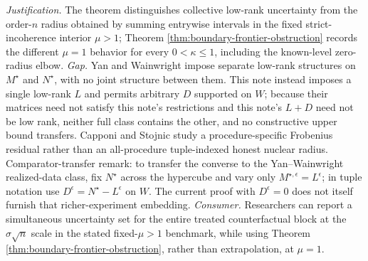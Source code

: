 \documentclass{article}
\begin{document}
\par\smallskip\noindent \textit{Justification.} The theorem distinguishes collective low-rank uncertainty from the order-\(n\) radius obtained by summing entrywise intervals in the fixed strict-incoherence interior \(\mu>1\); Theorem \ref{thm:boundary-frontier-obstruction} records the different \(\mu=1\) behavior for every \(0<\kappa\le1\), including the known-level zero-radius elbow. \textit{Gap.} Yan and Wainwright impose separate low-rank structures on \(M^\star\) and \(N^\star\), with no joint structure between them. This note instead imposes a single low-rank \(L\) and permits arbitrary \(D\) supported on \(W\); because their matrices need not satisfy this note's restrictions and this note's \(L+D\) need not be low rank, neither full class contains the other, and no constructive upper bound transfers. Capponi and Stojnic study a procedure-specific Frobenius residual rather than an all-procedure tuple-indexed honest nuclear radius. Comparator-transfer remark: to transfer the converse to the Yan--Wainwright realized-data class, fix \(N^\star\) across the hypercube and vary only \(M^{\star,\epsilon}=L^\epsilon\); in tuple notation use \(D^\epsilon=N^\star-L^\epsilon\) on \(W\). The current proof with \(D^\epsilon=0\) does not itself furnish that richer-experiment embedding. \textit{Consumer.} Researchers can report a simultaneous uncertainty set for the entire treated counterfactual block at the \(\sigma\sqrt n\) scale in the stated fixed-\(\mu>1\) benchmark, while using Theorem \ref{thm:boundary-frontier-obstruction}, rather than extrapolation, at \(\mu=1\).
\end{document}
